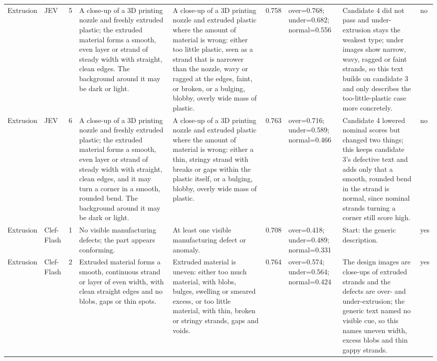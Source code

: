 \begin{table}
\begin{tabular}[t]{llrllrlll}
Extrusion & JEV & 5 & A close-up of a 3D printing nozzle and freshly extruded plastic; the extruded material forms a smooth, even layer or strand of steady width with straight, clean edges. The background around it may be dark or light. & A close-up of a 3D printing nozzle and extruded plastic where the amount of material is wrong: either too little plastic, seen as a strand that is narrower than the nozzle, wavy or ragged at the edges, faint, or broken, or a bulging, blobby, overly wide mass of plastic. & 0.758 & over=0.768; under=0.682; normal=0.556 & Candidate 4 did not pass and under-extrusion stays the weakest type; under images show narrow, wavy, ragged or faint strands, so this text builds on candidate 3 and only describes the too-little-plastic case more concretely. & no\\
\addlinespace
Extrusion & JEV & 6 & A close-up of a 3D printing nozzle and freshly extruded plastic; the extruded material forms a smooth, even layer or strand of steady width with straight, clean edges, and it may turn a corner in a smooth, rounded bend. The background around it may be dark or light. & A close-up of a 3D printing nozzle and extruded plastic where the amount of material is wrong: either a thin, stringy strand with breaks or gaps within the plastic itself, or a bulging, blobby, overly wide mass of plastic. & 0.763 & over=0.716; under=0.589; normal=0.466 & Candidate 4 lowered nominal scores but changed two things; this keeps candidate 3's defective text and adds only that a smooth, rounded bend in the strand is normal, since nominal strands turning a corner still score high. & no\\
Extrusion & Clef-Flash & 1 & No visible manufacturing defects; the part appears conforming. & At least one visible manufacturing defect or anomaly. & 0.708 & over=0.418; under=0.489; normal=0.331 & Start: the generic description. & yes\\
Extrusion & Clef-Flash & 2 & Extruded material forms a smooth, continuous strand or layer of even width, with clean straight edges and no blobs, gaps or thin spots. & Extruded material is uneven: either too much material, with blobs, bulges, swelling or smeared excess, or too little material, with thin, broken or stringy strands, gaps and voids. & 0.764 & over=0.574; under=0.564; normal=0.424 & The design images are close-ups of extruded strands and the defects are over- and under-extrusion; the generic text named no visible cue, so this names uneven width, excess blobs and thin gappy strands. & yes\\

\end{tabular}
\end{table}
